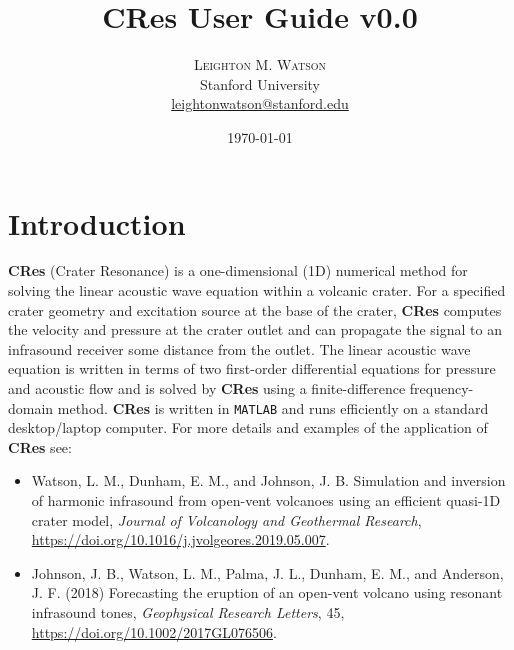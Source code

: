 \documentclass[10pt]{article}
\title{CRes User Guide v0.0} %
\author{%
\textsc{Leighton M. Watson} \\%
\normalsize Stanford University \\ %
\normalsize \href{mailto:leightonwatson@stanford.edu}{leightonwatson@stanford.edu} %
}
\date{\today} %
\begin{document}
\maketitle


\section{Introduction}
{\bf CRes} (Crater Resonance) is a one-dimensional (1D) numerical method for solving the linear acoustic wave equation within a volcanic crater. For a specified crater geometry and excitation source at the base of the crater, {\bf CRes} computes the velocity and pressure at the crater outlet and can propagate the signal to an infrasound receiver some distance from the outlet. The linear acoustic wave equation is written in terms of two first-order differential equations for pressure and acoustic flow and is solved by {\bf CRes} using a finite-difference frequency-domain method. {\bf CRes} is written in \texttt{MATLAB} and runs efficiently on a standard desktop/laptop computer. For more details and examples of the application of {\bf CRes} see:
\begin{itemize}
\item Watson, L. M., Dunham, E. M., and Johnson, J. B. Simulation and inversion of harmonic infrasound from open-vent volcanoes using an efficient quasi-1D crater model, \emph{Journal of Volcanology and Geothermal Research}, \href{https://doi.org/10.1016/j.jvolgeores.2019.05.007}{https://doi.org/10.1016/j.jvolgeores.2019.05.007}.
\item Johnson, J. B., Watson, L. M., Palma, J. L., Dunham, E. M., and Anderson, J. F. (2018) Forecasting the eruption of an open-vent volcano using resonant infrasound tones, \emph{Geophysical Research Letters}, 45, \href{https://doi.org/10.1002/2017GL076506}{https://doi.org/10.1002/2017GL076506}.
\end{itemize}
\end{document}
